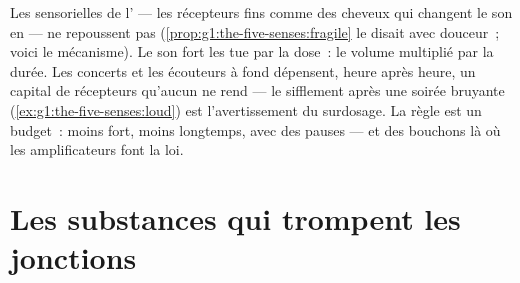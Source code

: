 \begin{proposition}\label{prop:g8:protecting-the-nervous-system:noise}
Les  sensorielles de l' --- les récepteurs
fins comme des cheveux qui changent le son en  --- ne repoussent pas
(\cref{prop:g1:the-five-senses:fragile} le disait avec
douceur~; voici le mécanisme). Le son fort les tue par la
dose~: le volume multiplié par la durée. Les concerts et
les écouteurs à fond dépensent, heure après heure, un
capital de récepteurs qu'aucun  ne rend --- le
sifflement après une soirée bruyante
(\cref{ex:g1:the-five-senses:loud}) est l'avertissement du
surdosage. La règle est un budget~: moins fort, moins
longtemps, avec des pauses --- et des bouchons là où les
amplificateurs font la loi.
\end{proposition}
\admitted

\section{Les substances qui trompent les jonctions}

